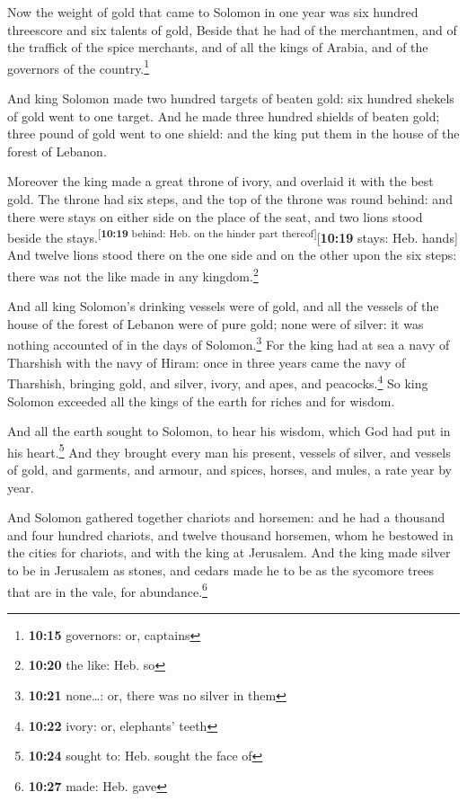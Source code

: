  Now the weight of gold that came to Solomon in one year
was six hundred threescore and six talents of gold, 
Beside that he had of the merchantmen, and of the traffick of the spice
merchants, and of all the kings of Arabia, and of the governors of the
country.\footnote{\textbf{10:15} governors: or, captains}

 And king Solomon made two hundred targets of beaten
gold: six hundred shekels of gold went to one target. 
And he made three hundred shields of beaten gold; three pound of gold
went to one shield: and the king put them in the house of the forest of
Lebanon.

 Moreover the king made a great throne of ivory, and
overlaid it with the best gold.  The throne had six
steps, and the top of the throne was round behind: and there were stays
on either side on the place of the seat, and two lions stood beside the
stays.\textsuperscript{{[}\textbf{10:19} behind: Heb. on the hinder part
thereof{]}}{[}\textbf{10:19} stays: Heb. hands{]}  And
twelve lions stood there on the one side and on the other upon the six
steps: there was not the like made in any kingdom.\footnote{\textbf{10:20}
  the like: Heb. so}

 And all king Solomon's drinking vessels were of gold,
and all the vessels of the house of the forest of Lebanon were of pure
gold; none were of silver: it was nothing accounted of in the days of
Solomon.\footnote{\textbf{10:21} none\ldots: or, there was no silver in
  them}  For the king had at sea a navy of Tharshish with
the navy of Hiram: once in three years came the navy of Tharshish,
bringing gold, and silver, ivory, and apes, and peacocks.\footnote{\textbf{10:22}
  ivory: or, elephants' teeth}  So king Solomon exceeded
all the kings of the earth for riches and for wisdom.

 And all the earth sought to Solomon, to hear his wisdom,
which God had put in his heart.\footnote{\textbf{10:24} sought to: Heb.
  sought the face of}  And they brought every man his
present, vessels of silver, and vessels of gold, and garments, and
armour, and spices, horses, and mules, a rate year by year.

 And Solomon gathered together chariots and horsemen: and
he had a thousand and four hundred chariots, and twelve thousand
horsemen, whom he bestowed in the cities for chariots, and with the king
at Jerusalem.  And the king made silver to be in
Jerusalem as stones, and cedars made he to be as the sycomore trees that
are in the vale, for abundance.\footnote{\textbf{10:27} made: Heb. gave}

